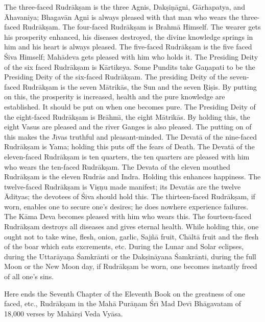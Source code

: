 The three-faced Rudr\=ak\d{s}am is the three Agnis, Dak\d{s}i\d{n}\=agni, G\=arhapatya, and \=Ahavaniya; Bhagav\=an Agni is always pleased with that man who wears the three-faced Rudr\=ak\d{s}am. The four-faced Rudr\=ak\d{s}am is Brahm\=a Himself. The wearer gets his prosperity enhanced, his diseases destroyed, the divine knowledge springs in him and his heart is always pleased. The five-faced Rudr\=ak\d{s}am is the five faced \'Siva Himself; Mah\=adeva gets pleased with him who holds it. The Presiding Deity of the six faced Rudr\=ak\d{s}am is K\=artikeya. Some Pundits take Ga\d{n}apati to be the Presiding Deity of the six-faced Rudr\=ak\d{s}am. The presiding Deity of the seven-faced Rudr\=ak\d{s}am is the seven M\=atrik\=as, the Sun and the seven \d{R}i\d{s}is. By putting on this, the prosperity is increased, health and the pure knowledge are established. It should be put on when one becomes pure. The Presiding Deity of the eight-faced Rudr\=ak\d{s}am is Br\=ahm\={\i}, the eight M\=atrik\=as. By holding this, the eight Vasus are pleased and the river Ganges is also pleased. The putting on of this makes the J\={\i}vas truthful and pleasant-minded. The Devat\=a of the nine-faced Rudr\=ak\d{s}am is Yama; holding this puts off the fears of Death. The Devat\=a of the eleven-faced Rudr\=ak\d{s}am is ten quarters, the ten quarters are pleased with him who wears the ten-faced Rudr\=ak\d{s}am. The Devata of the eleven mouthed Rudr\=ak\d{s}am is the eleven Rudr\=as and Indra. Holding this enhances happiness. The twelve-faced Rudr\=ak\d{s}am is Vi\d{s}\d{n}u made manifest; its Devat\=as are the twelve \=Adityas; the devotees of \'Siva should hold this. The thirteen-faced Rudr\=ak\d{s}am, if worn, enables one to secure one's desires; he does nowhere experience failures. The K\=ama Deva becomes pleased with him who wears this. The fourteen-faced Rudr\=ak\d{s}am destroys all diseases and gives eternal health. While holding this, one ought not to take wine, flesh, onion, garlic, Saj\~n\=a fruit, Ch\=alt\=a fruit and the flesh of the boar which eats excrements, etc. During the Lunar and Solar eclipses, during the Uttar\=aya\d{n}a \'Samkr\=anti or the Dak\d{s}in\=ayana \'Samkr\=anti, during the full Moon or the New Moon day, if Rudr\=ak\d{s}am be worn, one becomes instantly freed of all one's sins.

Here ends the Seventh Chapter of the Eleventh Book on the greatness of one faced, etc., Rudr\=ak\d{s}am in the Mah\=a Pur\=a\d{n}am \'Sr\={\i} Mad Dev\={\i} Bh\=agavatam of 18,000 verses by Mah\=ar\d{s}i Veda Vy\=asa.



